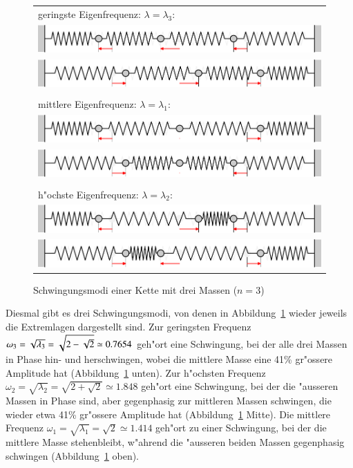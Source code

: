 \begin{figure}
\begin{center}
\begin{tabular}{l}
geringste Eigenfrequenz: $\lambda=\lambda_3$:\\
\includegraphics[width=\hsize]{images/e-8}\\
\includegraphics[width=\hsize]{images/e-9}\\
\\
mittlere Eigenfrequenz: $\lambda=\lambda_1$:\\
\includegraphics[width=\hsize]{images/e-6}\\
\includegraphics[width=\hsize]{images/e-7}\\
\\
h"ochste Eigenfrequenz: $\lambda=\lambda_2$:\\
\includegraphics[width=\hsize]{images/e-10}\\
\includegraphics[width=\hsize]{images/e-11}
\end{tabular}
\end{center}
\caption{Schwingungsmodi einer Kette mit drei Massen ($n=3$)\label{n3modi}}
\end{figure}%
Diesmal gibt es drei Schwingungsmodi, von denen in Abbildung~\ref{n3modi}
wieder jeweils die Extremlagen dargestellt sind.
Zur geringsten Frequenz
$\omega_3=\sqrt{\mathstrut\lambda_3}=\sqrt{2-\sqrt{2\mathstrut}}\simeq 0.7654$
geh"ort eine Schwingung, bei der alle drei Massen in Phase
hin- und herschwingen, wobei die mittlere Masse eine 41\% 
gr"ossere Amplitude hat (Abbildung~\ref{n3modi} unten).
Zur h"ochsten Frequenz
$\omega_2=\sqrt{\lambda_2}=\sqrt{2+\sqrt{2}}\simeq 1.848$
geh"ort eine Schwingung, bei der die "ausseren Massen in Phase sind,
aber gegenphasig zur mittleren Massen schwingen, die wieder etwa
41\% gr"ossere Amplitude hat (Abbildung~\ref{n3modi} Mitte).
Die mittlere Frequenz $\omega_1=\sqrt{\lambda_1}=\sqrt{2}\simeq 1.414$
geh"ort zu einer Schwingung, bei der die mittlere Masse stehenbleibt,
w"ahrend die "ausseren beiden Massen gegenphasig schwingen (Abbildung~\ref{n3modi} oben).


